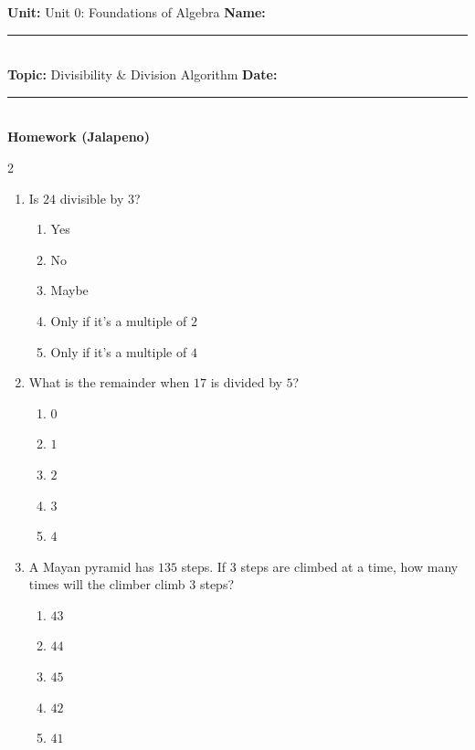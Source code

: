 \documentclass[10pt]{article}
\begin{document}
\enlargethispage{2.5cm}

\begin{tcolorbox}[colback=mainblue!5, colframe=mainblue, sharp corners, boxrule=0.5pt]
    \small \textbf{Unit:} Unit 0: Foundations of Algebra \hfill \textbf{Name:} \rule{3cm}{0.4pt} \\
    \small \textbf{Topic:} Divisibility & Division Algorithm \hfill \textbf{Date:} \rule{2cm}{0.4pt} \\
    \centering \textbf{\large Homework (Jalapeno)}
\end{tcolorbox}

\vspace{0.2cm}

\begin{multicols}{2}
\begin{enumerate}[label=\textbf{Q\arabic*.}, leftmargin=*, itemsep=6pt, parsep=0pt]

  \item \small Is $24$ divisible by $3$?
  \begin{enumerate}[label=(\Alph*), leftmargin=0.6cm, nosep, itemsep=2pt]
    \item Yes
    \item No
    \item Maybe
    \item Only if it's a multiple of $2$
    \item Only if it's a multiple of $4$
  \end{enumerate}

  \item \small What is the remainder when $17$ is divided by $5$?
  \begin{enumerate}[label=(\Alph*), leftmargin=0.6cm, nosep, itemsep=2pt]
    \item $0$
    \item $1$
    \item $2$
    \item $3$
    \item $4$
  \end{enumerate}

  \item \small A Mayan pyramid has $135$ steps. If $3$ steps are climbed at a time, how many times will the climber climb $3$ steps?
  \begin{enumerate}[label=(\Alph*), leftmargin=0.6cm, nosep, itemsep=2pt]
    \item $43$
    \item $44$
    \item $45$
    \item $42$
    \item $41$
  \end{enumerate}


\end{enumerate}
\end{multicols}
\end{document}
